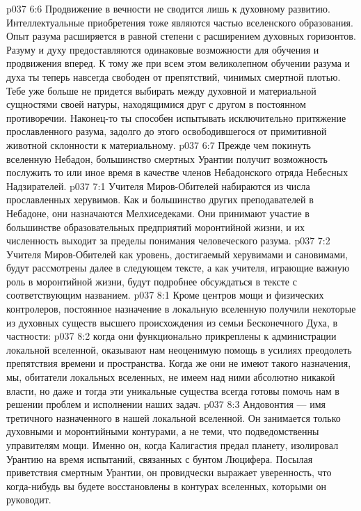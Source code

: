 \vs p037 6:6 Продвижение в вечности не сводится лишь к духовному развитию. Интеллектуальные приобретения тоже являются частью вселенского образования. Опыт разума расширяется в равной степени с расширением духовных горизонтов. Разуму и духу предоставляются одинаковые возможности для обучения и продвижения вперед. К тому же при всем этом великолепном обучении разума и духа ты теперь навсегда свободен от препятствий, чинимых смертной плотью. Тебе уже больше не придется выбирать между духовной и материальной сущностями своей натуры, находящимися друг с другом в постоянном противоречии. Наконец\hyp{}то ты способен испытывать исключительно притяжение прославленного разума, задолго до этого освободившегося от примитивной животной склонности к материальному.
\vs p037 6:7 \pc Прежде чем покинуть вселенную Небадон, большинство смертных Урантии получит возможность послужить то или иное время в качестве членов Небадонского отряда Небесных Надзирателей.
\vs p037 7:1 Учителя Миров\hyp{}Обителей набираются из числа прославленных херувимов. Как и большинство других преподавателей в Небадоне, они назначаются Мелхиседеками. Они принимают участие в большинстве образовательных предприятий моронтийной жизни, и их численность выходит за пределы понимания человеческого разума.
\vs p037 7:2 Учителя Миров\hyp{}Обителей как уровень, достигаемый херувимами и сановимами, будут рассмотрены далее в следующем тексте, а как учителя, играющие важную роль в моронтийной жизни, будут подробнее обсуждаться в тексте с соответствующим названием.
\vs p037 8:1 Кроме центров мощи и физических контролеров, постоянное назначение в локальную вселенную получили некоторые из духовных существ высшего происхождения из семьи Бесконечного Духа, в частности:
\vs p037 8:2 \pc {} когда они функционально прикреплены к администрации локальной вселенной, оказывают нам неоценимую помощь в усилиях преодолеть препятствия времени и пространства. Когда же они не имеют такого назначения, мы, обитатели локальных вселенных, не имеем над ними абсолютно никакой власти, но даже и тогда эти уникальные существа всегда готовы помочь нам в решении проблем и исполнении наших задач.
\vs p037 8:3 Андовонтия --- имя третичного  назначенного в нашей локальной вселенной. Он занимается только духовными и моронтийными контурами, а не теми, что подведомственны управителям мощи. Именно он, когда Калигастия предал планету, изолировал Урантию на время испытаний, связанных с бунтом Люцифера. Посылая приветствия смертным Урантии, он провидчески выражает уверенность, что когда\hyp{}нибудь вы будете восстановлены в контурах вселенных, которыми он руководит.
